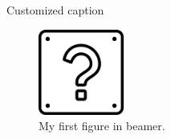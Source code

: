 \documentclass{beamer}
\begin{document}
\begin{frame}{Customized caption}

\begin{figure}
\centering
    \includegraphics[width=0.25\textwidth]{Ques}
    \caption{My first figure in beamer.}
    \label{fig:question}
\end{figure}

\end{frame}
\end{document}
